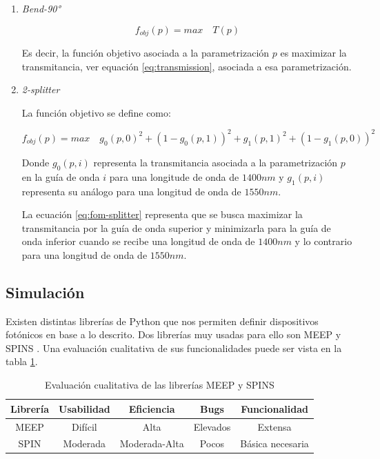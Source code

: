 \begin{enumerate}

\item \emph{Bend-90°}

\begin{equation}
f_{obj}(p) = max \quad T(p)
\label{eq:fom-bend}
\end{equation}

Es decir, la función objetivo asociada a la parametrización $p$ es maximizar la transmitancia, ver equación \ref{eq:transmission}, asociada a esa parametrización.

\item \emph{2-splitter}

La función objetivo se define como:

\begin{equation}
  f_{obj}(p) = max \quad g_0(p, 0)^2 + (1 - g_0(p, 1))^2 + g_1(p, 1)^2 + (1 - g_1(p, 0))^2
\label{eq:fom-splitter}
\end{equation}

Donde $g_0(p, i)$ representa la transmitancia asociada a la parametrización $p$ en la guía de onda $i$ para una longitude de onda de $1400 nm$ y 
      $g_1(p, i)$ representa su análogo para una longitud de onda de $1550 nm$.

La ecuación \ref{eq:fom-splitter} representa que se busca maximizar la transmitancia por la guía de onda superior y minimizarla para la guía de onda inferior cuando se recibe una longitud de onda de $1400 nm$ y lo contrario para una longitud de onda de $1550 nm$.

\end{enumerate}

\subsection{Simulación}

Existen distintas librerías de Python que nos permiten definir dispositivos fotónicos en base a lo descrito. 
Dos librerías muy usadas para ello son MEEP \citep{Oskooi2010} y SPINS \citep{Su2020}. 
Una evaluación cualitativa de sus funcionalidades puede ser vista en la tabla \ref{tab:simulation}.

\begin{table}[ht]
    \centering
    \begin{tabular}{|c|c|c|c|c|}
    \hline 
    Librería &  Usabilidad & Eficiencia & Bugs & Funcionalidad \\
    \hline 
    MEEP &  Difícil & Alta & Elevados & Extensa \\
    SPIN &  Moderada  & Moderada-Alta & Pocos & Básica necesaria \\
    \hline 
    \end{tabular}
    \caption{Evaluación cualitativa de las librerías MEEP y SPINS}
    \label{tab:simulation}
\end{table}


